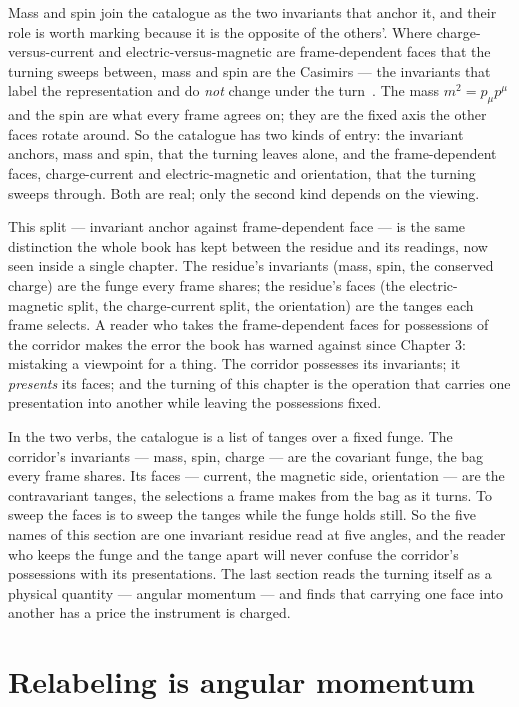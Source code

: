 Mass and spin join the catalogue as the two invariants that anchor it, and their role is worth marking because it is the
opposite of the others'. Where charge-versus-current and electric-versus-magnetic are frame-dependent faces that the turning
sweeps between, mass and spin are the Casimirs --- the invariants that label the representation and do \emph{not} change
under the turn~\cite{dirac1928}. The mass $m^2 = p_\mu p^\mu$ and the spin are what every frame agrees on; they are the fixed
axis the other faces rotate around. So the catalogue has two kinds of entry: the invariant anchors, mass and spin, that the
turning leaves alone, and the frame-dependent faces, charge-current and electric-magnetic and orientation, that the turning
sweeps through. Both are real; only the second kind depends on the viewing.

This split --- invariant anchor against frame-dependent face --- is the same distinction the whole book has kept between the
residue and its readings, now seen inside a single chapter. The residue's invariants (mass, spin, the conserved charge) are
the funge every frame shares; the residue's faces (the electric-magnetic split, the charge-current split, the orientation) are
the tanges each frame selects. A reader who takes the frame-dependent faces for possessions of the corridor makes the
error the book has warned against since Chapter 3: mistaking a viewpoint for a thing. The corridor possesses its invariants;
it \emph{presents} its faces; and the turning of this chapter is the operation that carries one presentation into another
while leaving the possessions fixed.

In the two verbs, the catalogue is a list of tanges over a fixed funge. The corridor's invariants --- mass, spin, charge ---
are the covariant funge, the bag every frame shares. Its faces --- current, the magnetic side, orientation --- are the
contravariant tanges, the selections a frame makes from the bag as it turns. To sweep the faces is to sweep the tanges while
the funge holds still. So the five names of this section are one invariant residue read at five angles, and the reader who
keeps the funge and the tange apart will never confuse the corridor's possessions with its presentations. The last section
reads the turning itself as a physical quantity --- angular momentum --- and finds that carrying one face into another has a
price the instrument is charged.

\section{Relabeling is angular momentum}

